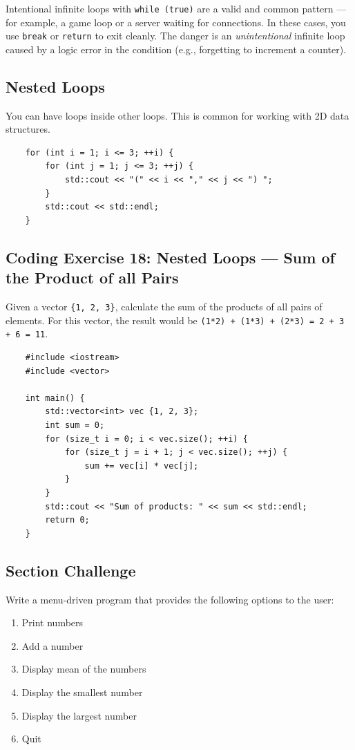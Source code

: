 \begin{remark}
	Intentional infinite loops with \texttt{while (true)} are a valid and common pattern — for example, a game loop or a server waiting for connections. In these cases, you use \texttt{break} or \texttt{return} to exit cleanly. The danger is an \textit{unintentional} infinite loop caused by a logic error in the condition (e.g., forgetting to increment a counter).
\end{remark}

\subsection{Nested Loops}
You can have loops inside other loops. This is common for working with 2D data structures.
\begin{lstlisting}
	for (int i = 1; i <= 3; ++i) {
		for (int j = 1; j <= 3; ++j) {
			std::cout << "(" << i << "," << j << ") ";
		}
		std::cout << std::endl;
	}
\end{lstlisting}

\subsection{Coding Exercise 18: Nested Loops --- Sum of the Product of all Pairs}
Given a vector \texttt{\{1, 2, 3\}}, calculate the sum of the products of all pairs of elements. For this vector, the result would be \texttt{(1*2) + (1*3) + (2*3) = 2 + 3 + 6 = 11}.
\begin{lstlisting}
	#include <iostream>
	#include <vector>

	int main() {
		std::vector<int> vec {1, 2, 3};
		int sum = 0;
		for (size_t i = 0; i < vec.size(); ++i) {
			for (size_t j = i + 1; j < vec.size(); ++j) {
				sum += vec[i] * vec[j];
			}
		}
		std::cout << "Sum of products: " << sum << std::endl;
		return 0;
	}
\end{lstlisting}

\subsection{Section Challenge}
Write a menu-driven program that provides the following options to the user:
\begin{enumerate}
	\item Print numbers
	\item Add a number
	\item Display mean of the numbers
	\item Display the smallest number
	\item Display the largest number
	\item Quit
\end{enumerate}

